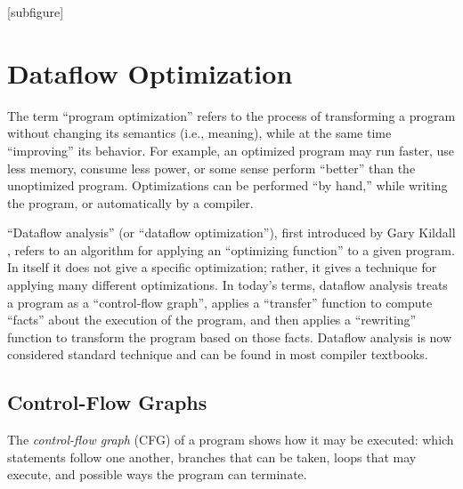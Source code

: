 \documentclass[12pt]{report}
\begin{document}

[subfigure]
\renewcommand{\textfraction}{0.1}
\renewcommand{\topfraction}{0.9}

\chapter{Dataflow Optimization}
\label{ref_chapter_background}



The term ``program optimization'' refers to the process of
transforming a program without changing its semantics (i.e., meaning),
while at the same time ``improving'' its behavior.  For example, an
optimized program may run faster, use less memory, consume less power,
or some sense perform ``better'' than the unoptimized
program. Optimizations can be performed ``by hand,'' while writing
the program, or automatically by a compiler. 

``Dataflow analysis'' (or ``dataflow optimization''), first introduced
by Gary Kildall \citep{Kildall1973}, refers to an algorithm for
applying an ``optimizing function'' to a given program. In itself it
does not give a specific optimization; rather, it gives a technique
for applying many different optimizations. In today's terms, dataflow
analysis treats a program as a ``control-flow graph'', applies a
``transfer'' function to compute ``facts'' about the execution of the
program, and then applies a ``rewriting'' function to transform the
program based on those facts. Dataflow analysis is now considered
standard technique and can be found in most compiler textbooks. 

\section{Control-Flow Graphs}
\label{sec_back1}
\newcommand{\inE}{\emph{in}\xspace}
\newcommand{\out}{\emph{out}\xspace}
\newcommand{\In}{\emph{In}\xspace}
\newcommand{\Out}{\emph{Out}\xspace}


The \emph{control-flow graph} (CFG) of a program shows how it
may be executed: which statements follow one another, branches that
can be taken, loops that may execute, and possible ways the program
can terminate.
\end{document}

